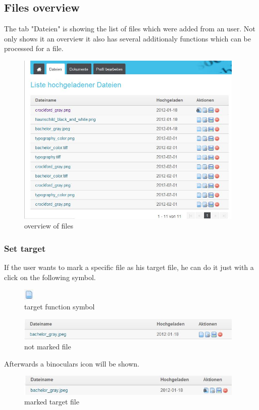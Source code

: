 \subsection{Files overview}
The tab "Dateien" is showing the list of files which were added from an user. Not only shows it an overview it also has several additionaly functions which can be processed for a file.
\begin{figure}[!ht]
  \centering
    \includegraphics[width=0.97\textwidth]{images/basic_functionalities/dateien.jpg}
  \caption{overview of files}
  \label{fig:einloggen}
\end{figure}
\subsubsection{Set target}
If the user wants to mark a specific file as his target file, he can do it just with a click on the following symbol.
\begin{figure}[!ht]
  \centering
    \includegraphics[width=0.05\textwidth]{images/basic_functionalities/set_target2.jpg}
  \caption{target function symbol}
  \label{fig:einloggen}
\end{figure}
\begin{figure}[!ht]
  \centering
    \includegraphics[width=0.97\textwidth]{images/basic_functionalities/set_target1.jpg}
  \caption{not marked file}
  \label{fig:einloggen}
\end{figure}
Afterwards a binoculars icon will be shown.
\begin{figure}[!ht]
  \centering
    \includegraphics[width=0.97\textwidth]{images/basic_functionalities/set_target3.jpg}
  \caption{marked target file}
  \label{fig:target file}
\end{figure}
